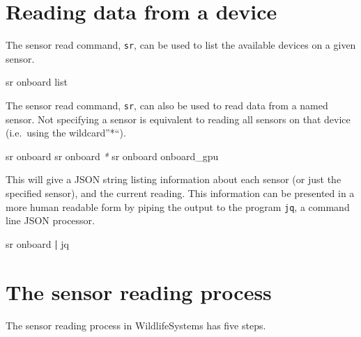 \documentclass[
]{book}
\newenvironment{Shaded}{\begin{snugshade}}{\end{snugshade}}
\newcommand{\ExtensionTok}[1]{#1}
\newcommand{\KeywordTok}[1]{\textcolor[rgb]{0.13,0.29,0.53}{\textbf{#1}}}
\newcommand{\NormalTok}[1]{#1}
\newcommand{\PreprocessorTok}[1]{\textcolor[rgb]{0.56,0.35,0.01}{\textit{#1}}}
\begin{document}
\section{Reading data from a device}\label{reading-data-from-a-device}

The sensor read command, \texttt{sr}, can be used to list the available devices on a given sensor.

\begin{Shaded}
\begin{Highlighting}[]
\ExtensionTok{sr}\NormalTok{ onboard list}
\end{Highlighting}
\end{Shaded}

The sensor read command, \texttt{sr}, can also be used to read data from a named sensor. Not specifying a sensor is equivalent to reading all sensors on that device (i.e.~using the wildcard''*``).

\begin{Shaded}
\begin{Highlighting}[]
\ExtensionTok{sr}\NormalTok{ onboard}
\ExtensionTok{sr}\NormalTok{ onboard }\PreprocessorTok{*}
\ExtensionTok{sr}\NormalTok{ onboard onboard\_gpu}
\end{Highlighting}
\end{Shaded}

This will give a JSON string listing information about each sensor (or just the specified sensor), and the current reading. This information can be presented in a more human readable form by piping the output to the program \texttt{jq}, a command line JSON processor.

\begin{Shaded}
\begin{Highlighting}[]
\ExtensionTok{sr}\NormalTok{ onboard }\KeywordTok{|} \ExtensionTok{jq}
\end{Highlighting}
\end{Shaded}

\section{The sensor reading process}\label{the-sensor-reading-process}

The sensor reading process in WildlifeSystems has five steps.
\end{document}
